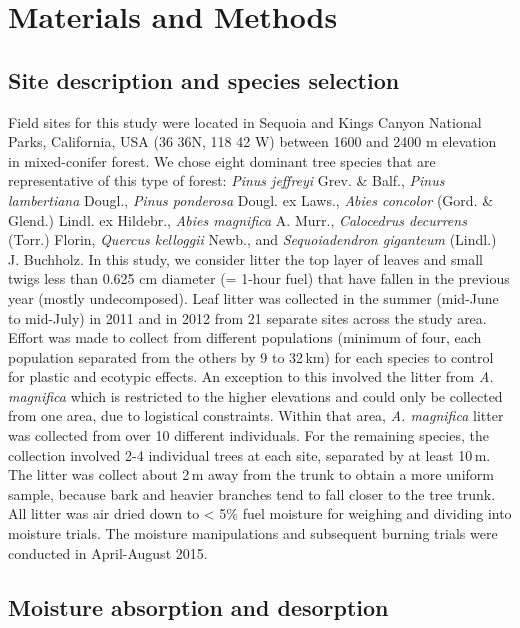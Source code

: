 \documentclass[fire,article,submit,moreauthors,pdftex]{Definitions/mdpi}
\begin{document}
\section{Materials and Methods}

\subsection{Site description and species selection}

Field sites for this study were located in Sequoia and Kings Canyon National Parks, California, USA (36 36N, 118 42 W) between 1600 and 2400 m elevation in mixed-conifer forest. We chose eight dominant tree species that are representative of this type of forest: \emph{Pinus jeffreyi} Grev. \& Balf., \emph{Pinus lambertiana} Dougl., \emph{Pinus ponderosa} Dougl. ex Laws., \emph{Abies concolor} (Gord. \& Glend.) Lindl. ex Hildebr., \emph{Abies magnifica} A. Murr., \emph{Calocedrus decurrens} (Torr.) Florin, \emph{Quercus kelloggii} Newb., and \emph{Sequoiadendron giganteum} (Lindl.) J. Buchholz. In this study, we consider litter the top layer of leaves and small twigs less than 0.625 cm diameter (= 1-hour fuel) that have fallen in the previous year (mostly undecomposed). Leaf litter was collected in the summer (mid-June to mid-July) in 2011 and in 2012 from 21 separate sites across the study area. Effort was made to collect from different populations (minimum of four, each population separated from the others by 9 to 32\,km) for each species to control for plastic and ecotypic effects. An exception to this involved the litter from \emph{A. magnifica} which is restricted to the higher elevations and could only be collected from one area, due to logistical constraints. Within that area, \emph{A. magnifica} litter was collected from over 10 different individuals. For the remaining species, the collection involved 2-4 individual trees at each site, separated by at least 10\,m. The litter was collect about 2\,m away from the trunk to obtain a more uniform sample, because bark and heavier branches tend to fall closer to the tree trunk. All litter was air dried down to < 5\% fuel moisture for weighing and dividing into moisture trials. The moisture manipulations and subsequent burning trials were conducted in April-August 2015.

\subsection{Moisture absorption and desorption}
\end{document}
